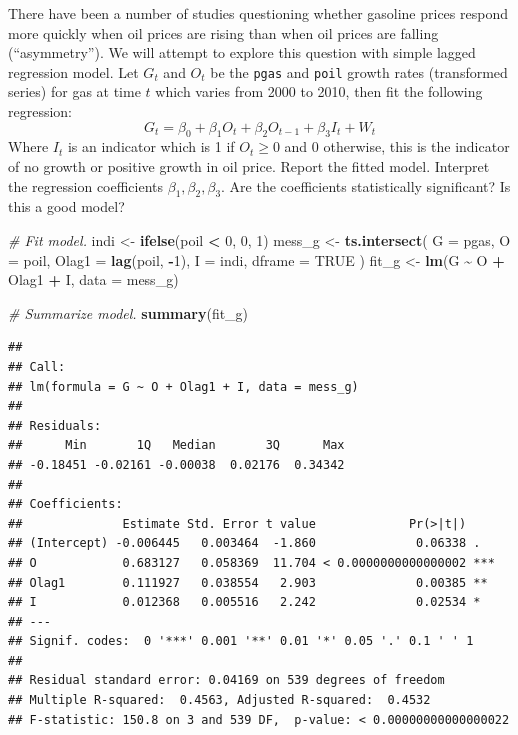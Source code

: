\documentclass[
  10pt,
]{extarticle}
\newenvironment{Shaded}{\begin{snugshade}}{\end{snugshade}}
\newcommand{\AttributeTok}[1]{\textcolor[rgb]{0.13,0.29,0.53}{#1}}
\newcommand{\CommentTok}[1]{\textcolor[rgb]{0.56,0.35,0.01}{\textit{#1}}}
\newcommand{\ConstantTok}[1]{\textcolor[rgb]{0.56,0.35,0.01}{#1}}
\newcommand{\DecValTok}[1]{\textcolor[rgb]{0.00,0.00,0.81}{#1}}
\newcommand{\FunctionTok}[1]{\textcolor[rgb]{0.13,0.29,0.53}{\textbf{#1}}}
\newcommand{\NormalTok}[1]{#1}
\newcommand{\OtherTok}[1]{\textcolor[rgb]{0.56,0.35,0.01}{#1}}
\newcommand{\SpecialCharTok}[1]{\textcolor[rgb]{0.81,0.36,0.00}{\textbf{#1}}}
\begin{document}
\begin{problem}[Problem 1 (g)]
There have been a number of studies questioning whether gasoline prices respond more quickly when oil prices are rising than when oil prices are falling (“asymmetry”). We will attempt to explore this question with simple lagged regression model. Let \(G_t\) and \(O_t\) be the \texttt{pgas} and \texttt{poil} growth rates (transformed series) for gas at time \(t\) which varies from 2000 to 2010, then fit the following regression:
\[
G_t = \beta_0 + \beta_1 O_t + \beta_2 O_{t-1} + \beta_3 I_t + W_t
\]
Where \(I_t\) is an indicator which is 1 if \(O_t \ge 0\) and 0 otherwise, this is the indicator of no growth or positive growth in oil price. Report the fitted model. Interpret the regression coefficients \(\beta_1, \beta_2,\beta_3\). Are the coefficients statistically significant? Is this a good model?
\end{problem}

\begin{Shaded}
\begin{Highlighting}[]
\CommentTok{\# Fit model.}
\NormalTok{indi }\OtherTok{\textless{}{-}} \FunctionTok{ifelse}\NormalTok{(poil }\SpecialCharTok{\textless{}} \DecValTok{0}\NormalTok{, }\DecValTok{0}\NormalTok{, }\DecValTok{1}\NormalTok{)}
\NormalTok{mess\_g }\OtherTok{\textless{}{-}} \FunctionTok{ts.intersect}\NormalTok{(}
  \AttributeTok{G =}\NormalTok{ pgas,}
  \AttributeTok{O =}\NormalTok{ poil,}
  \AttributeTok{Olag1 =} \FunctionTok{lag}\NormalTok{(poil, }\SpecialCharTok{{-}}\DecValTok{1}\NormalTok{),}
  \AttributeTok{I =}\NormalTok{ indi,}
  \AttributeTok{dframe =} \ConstantTok{TRUE}
\NormalTok{)}
\NormalTok{fit\_g }\OtherTok{\textless{}{-}} \FunctionTok{lm}\NormalTok{(G }\SpecialCharTok{\textasciitilde{}}\NormalTok{ O }\SpecialCharTok{+}\NormalTok{ Olag1 }\SpecialCharTok{+}\NormalTok{ I, }\AttributeTok{data =}\NormalTok{ mess\_g)}

\CommentTok{\# Summarize model.}
\FunctionTok{summary}\NormalTok{(fit\_g)}
\end{Highlighting}
\end{Shaded}

\begin{verbatim}
## 
## Call:
## lm(formula = G ~ O + Olag1 + I, data = mess_g)
## 
## Residuals:
##      Min       1Q   Median       3Q      Max 
## -0.18451 -0.02161 -0.00038  0.02176  0.34342 
## 
## Coefficients:
##              Estimate Std. Error t value             Pr(>|t|)    
## (Intercept) -0.006445   0.003464  -1.860              0.06338 .  
## O            0.683127   0.058369  11.704 < 0.0000000000000002 ***
## Olag1        0.111927   0.038554   2.903              0.00385 ** 
## I            0.012368   0.005516   2.242              0.02534 *  
## ---
## Signif. codes:  0 '***' 0.001 '**' 0.01 '*' 0.05 '.' 0.1 ' ' 1
## 
## Residual standard error: 0.04169 on 539 degrees of freedom
## Multiple R-squared:  0.4563, Adjusted R-squared:  0.4532 
## F-statistic: 150.8 on 3 and 539 DF,  p-value: < 0.00000000000000022
\end{verbatim}
\end{document}
